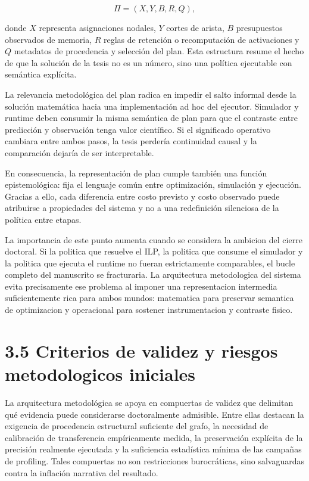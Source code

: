$$
\Pi = (X, Y, B, R, Q),
$$

donde $X$ representa asignaciones nodales, $Y$ cortes de arista, $B$ presupuestos observados de memoria, $R$ reglas de retención o recomputación de activaciones y $Q$ metadatos de procedencia y selección del plan. Esta estructura resume el hecho de que la solución de la tesis no es un número, sino una política ejecutable con semántica explícita.

La relevancia metodológica del plan radica en impedir el salto informal desde la solución matemática hacia una implementación ad hoc del ejecutor. Simulador y runtime deben consumir la misma semántica de plan para que el contraste entre predicción y observación tenga valor científico. Si el significado operativo cambiara entre ambos pasos, la tesis perdería continuidad causal y la comparación dejaría de ser interpretable.

En consecuencia, la representación de plan cumple también una función epistemológica: fija el lenguaje común entre optimización, simulación y ejecución. Gracias a ello, cada diferencia entre costo previsto y costo observado puede atribuirse a propiedades del sistema y no a una redefinición silenciosa de la política entre etapas.

La importancia de este punto aumenta cuando se considera la ambicion del cierre doctoral. Si la politica que resuelve el ILP, la politica que consume el simulador y la politica que ejecuta el runtime no fueran estrictamente comparables, el bucle completo del manuscrito se fracturaria. La arquitectura metodologica del sistema evita precisamente ese problema al imponer una representacion intermedia suficientemente rica para ambos mundos: matematica para preservar semantica de optimizacion y operacional para sostener instrumentacion y contraste fisico.

\section{3.5 Criterios de validez y riesgos metodologicos iniciales}
La arquitectura metodológica se apoya en compuertas de validez que delimitan qué evidencia puede considerarse doctoralmente admisible. Entre ellas destacan la exigencia de procedencia estructural suficiente del grafo, la necesidad de calibración de transferencia empíricamente medida, la preservación explícita de la precisión realmente ejecutada y la suficiencia estadística mínima de las campañas de profiling. Tales compuertas no son restricciones burocráticas, sino salvaguardas contra la inflación narrativa del resultado.

